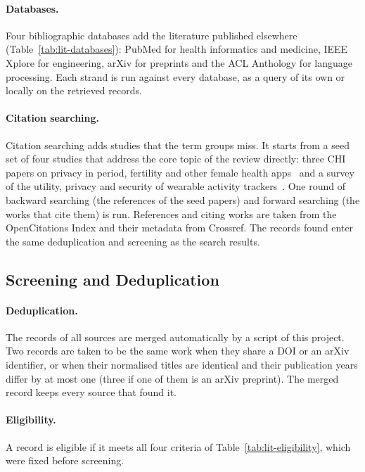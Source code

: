 \paragraph{Databases.} Four bibliographic databases add the literature published
elsewhere (Table~\ref{tab:lit-databases}): PubMed for health informatics and
medicine, IEEE Xplore for engineering, arXiv for preprints and the ACL Anthology
for language processing. Each strand is run against every database, as a query
of its own or locally on the retrieved records.

\paragraph{Citation searching.} Citation searching adds studies that the term
groups miss. It starts from a seed set of four studies that address the core
topic of the review directly: three CHI papers on privacy in period, fertility
and other female health
apps~\parencite{malki2024exploring,hudig2025intimate,cao2024deleted} and a
survey of the utility, privacy and security of wearable activity
trackers~\parencite{niksirat2024wearable}. One round of backward searching (the
references of the seed papers) and forward searching (the works that cite them)
is run. References and citing works are taken from the OpenCitations Index and
their metadata from Crossref. The records found enter the same deduplication
and screening as the search results.

\subsection{Screening and Deduplication}
\label{sec:lit-screening}
\paragraph{Deduplication.} The records of all sources are merged automatically
by a script of this project. Two records are taken to be the same work when
they share a DOI or an arXiv identifier, or when their normalised titles are identical and
their publication years differ by at most one (three if one of them is an arXiv preprint).
The merged record keeps every source that found it.

\paragraph{Eligibility.} A record is eligible if it meets all four criteria of
Table~\ref{tab:lit-eligibility}, which were fixed before screening.

